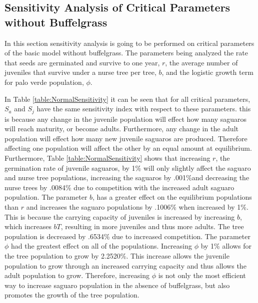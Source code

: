 \documentclass[a4paper]{article}
\begin{document}
\subsection{Sensitivity Analysis of Critical Parameters without Buffelgrass}
In this section sensitivity analysis is going to be performed on critical parameters of the basic model without buffelgrass. The parameters being analyzed the rate that seeds are germinated and survive to one year, $r$, the average number of juveniles that survive under a nurse tree per tree, $b$, and the logistic growth term for palo verde population, $\phi$.

In Table \ref{table:NormalSensitivity} it can be seen that for all critical parameters, $S_a$ and $S_j$ have the same sensitivity index with respect to these parameters. this is because any change in the juvenile population will effect how many saguaros will reach maturity, or become adults. Furthermore, any change in the adult population will effect how many new juvenile saguaros are produced. Therefore affecting one population will affect the other by an equal amount at equilibrium. Furthermore, Table \ref{table:NormalSensitivity} shows that increasing $r$, the germination rate of juvenile saguaros, by 1\% will only slightly affect the saguaro and nurse tree populations, increasing the saguaros by .001\%and decreasing the nurse trees by .0084\% due to competition with the increased adult saguaro population. The parameter $b$, has a greater effect on the equilibrium populations than $r$ and increases the saguaro populations by .1006\% when increased by 1\%. This is because the carrying capacity of juveniles is increased by increasing $b$, which increases $bT$, resulting in more juveniles and thus more adults. The tree population is decreased by .6534\% due to increased competition. The parameter $\phi$ had the greatest effect on all of the populations. Increasing $\phi$ by 1\% allows for the tree population to grow by 2.2520\%. This increase allows the juvenile population to grow through an increased carrying capacity and thus allows the adult population to grow. Therefore, increasing $\phi$ is not only the most efficient way to increase saguaro population in the absence of buffelgrass, but also promotes the growth of the tree population. 
\end{document}
